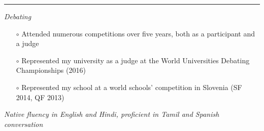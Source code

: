 \documentclass[a4paper]{article}
\begin{document}

\vspace{5pt}
\hrule
\vspace{5pt}

\noindent \textit{Debating}
\begin{itemize}
\item[$\circ$] Attended numerous competitions over five years, both as a participant and a judge
\item[$\circ$] Represented my university as a judge at the World Universities Debating Championships (2016)
\item[$\circ$] Represented my school at a world schools' competition in Slovenia (SF 2014, QF 2013)
\end{itemize}

\noindent \textit{Native fluency in English and Hindi, proficient in Tamil and Spanish conversation}
\end{document}
